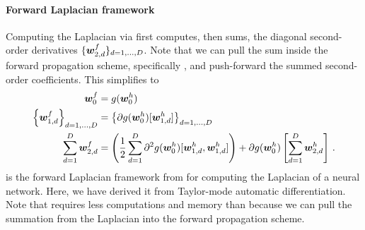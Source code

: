\paragraph{Forward Laplacian framework}
Computing the Laplacian via  first computes, then sums, the diagonal second-order derivatives $\{ {\bm{w}}_{2,d}^f \}_{d=1,\dots, D}$.
Note that we can pull the sum inside the forward propagation scheme, specifically , and push-forward the summed second-order coefficients. This simplifies  to
\begin{subequations}\label{eq:forward-laplacian}
  \begin{align}
    {\bm{w}}_0^f
    &=
      g({\bm{w}}_0^h)
    \\
    \left\{
    {\bm{w}}_{1,d}^f
    \right\}_{d=1, \dots, D}
    &=
      \left\{
      \partial g({\bm{w}}_0^h)[{\bm{w}}_{1,d}^h]
      \right\}_{d=1, \dots, D}
    \\
    \sum_{d=1}^D
    {\bm{w}}_{2,d}^f
    &=
      \left(
      \frac{1}{2}
      \sum_{d=1}^D
      \partial^2 g({\bm{w}}_0^h)[{\bm{w}}_{1,d}^h, {\bm{w}}_{1,d}^h]
      \right)
      +
      \partial g({\bm{w}}_0^h)
      \left[
      \sum_{d=1}^D {\bm{w}}_{2,d}^h
      \right]\,.
  \end{align}
\end{subequations}
 is the forward Laplacian framework from \citet{li2023forward} for computing the Laplacian of a neural network.
Here, we have derived it from Taylor-mode automatic differentiation.
Note that  requires less computations and memory than  because we can pull the summation from the Laplacian into the forward propagation scheme.

